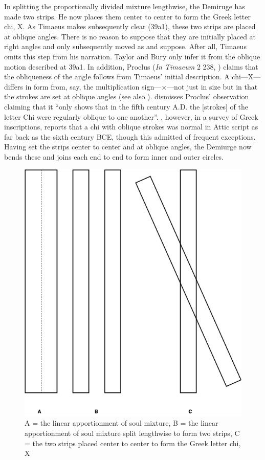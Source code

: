 In splitting the proportionally divided mixture lengthwise, the Demiruge has made two strips. He now places them center to center to form the Greek letter chi, {\sbl Χ}. As Timaeus makes subsequently clear (39a1), these two strips are placed at oblique angles. There is no reason to suppose that they are initially placed at right angles and only subsequently moved as \citet[147]{Taylor:1928qb} and \citet[36 n1]{Bury:1929jb} suppose. After all, Timaeus omits this step from his narration. Taylor and Bury only infer it from the oblique motion described at 39a1. In addition, Proclus (\emph{In Timaeum} 2 238, \citealt{Diehl:1903re}) claims that the obliqueness of the angle follows from Timaeus' initial description. A chi---{\sbl Χ}---differs in form from, say, the multiplication sign---×---not just in size but in that the strokes are set at oblique angles (see also \citealt[111 n7]{Archer-Hind:1888qd}). \citet[147 n1]{Taylor:1928qb} dismisses Proclus' observation claiming that it ``only shows that in the fifth century \textsc{A}.\textsc{D}. the [strokes] of the letter Chi were regularly oblique to one another''. \citet[67]{Jeffrey:1961aa}, however, in a survey of Greek inscriptions, reports that a chi with oblique strokes was normal in Attic script as far back as the sixth century \textsc{BCE}, though this admitted of frequent exceptions. Having set the strips center to center and at oblique angles, the Demiurge now bends these and joins each end to end to form inner and outer circles. 

\begin{figure}[htbp]
	\centering
		\includegraphics[scale=0.35]{graphics/splitting.png}
	\caption{A = the linear apportionment of soul mixture, B = the linear apportionment of soul mixture split lengthwise to form two strips, C = the two strips placed center to center to form the Greek letter chi, {\sbl Χ}}
	\label{fig:splitting}
\end{figure}

